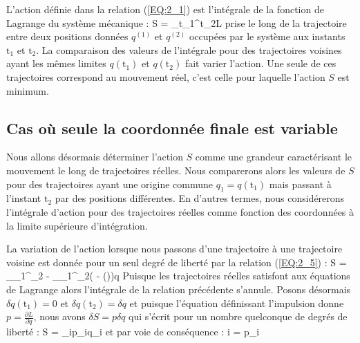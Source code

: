 L'action d\'{e}finie dans la relation (\ref{EQ:2_1}) est l'int\'{e}grale de la fonction de Lagrange du syst\`{e}me m\'{e}canique :
\be
	S = \int_{t_{1}}^{t_{2}}L \label{EQ:43_1}
\ee
prise le long de la trajectoire entre deux positions donn\'{e}es $q^{(1)}$ et $q^{(2)}$ occup\'{e}es par le syst\`{e}me aux instants $\mathrm{t}_{1}$ et $\mathrm{t}_{2}$. La comparaison des valeurs de l'int\'{e}grale pour des trajectoires voisines ayant les m\^{e}mes limites $q(\mathrm{t}_{1})$ et $q(\mathrm{t}_{2})$ fait varier l'action. Une seule de ces trajectoires correspond au mouvement r\'{e}el, c'est celle pour laquelle l'action $S$ est minimum.

\subsection{Cas o\`{u} seule la coordonn\'{e}e finale est variable}

Nous allons d\'{e}sormais d\'{e}terminer l'action $S$ comme une grandeur caract\'{e}risant le mouvement le long de trajectoires r\'{e}elles. Nous comparerons alors les valeurs de $S$ pour des trajectoires ayant une origine commune $q_{1} = q(\mathrm{t}_{1})$ mais passant \`{a} l'instant $\mathrm{t}_{2}$ par des positions diff\'{e}rentes. En d'autres termes, nous consid\'{e}rerons l'int\'{e}grale d'action pour des trajectoires r\'{e}elles comme fonction des coordonn\'{e}es \`{a} la limite sup\'{e}rieure d'int\'{e}gration.

La variation de l'action lorsque nous passons d'une trajectoire \`{a} une trajectoire voisine est donn\'{e}e pour un seul degr\'{e} de libert\'{e} par la relation (\ref{EQ:2_5}) :
\benn
	\delta S = _{_{1}}^{_{2}} - \int_{_{1}}^{_{2}}{\left( - \left(\right)\right)\delta q}
\eenn
Puisque les trajectoires r\'{e}elles satisfont aux \'{e}quations de Lagrange alors l'int\'{e}grale de la relation pr\'{e}c\'{e}dente s'annule. Posons d\'{e}sormais $\delta q(\mathrm{t}_{1}) = 0$ et $\delta q(\mathrm{t}_{2}) = \delta q$ et puisque l'\'{e}quation d\'{e}finissant l'impulsion donne $p = \frac{\partial L}{\partial\dot{q}}$, nous avons $\delta S = p\delta q$ qui s'\'{e}crit pour un nombre quelconque de degr\'{e}s de libert\'{e} :
\be
	\delta S = \sum_{i}p_{i}\delta q_{i} \label{EQ:43_2}
\ee
et par voie de cons\'{e}quence :
\be
	\forall i\text{, } = p_{i} \label{EQ:43_3}
\ee

